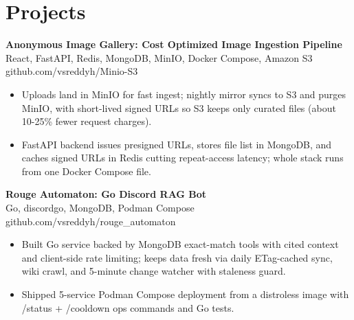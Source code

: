 \documentclass[a4paper,11pt]{article}
\newcommand{\resumeItem}[1]{\item \small{#1}}
\newcommand{\resumeSubheading}[4]{%
  \textbf{#1} \hfill \textbf{#2} \\
{#3} \hfill {#4}
}
\newcommand{\resumeSubHeadingListStart}{\begin{itemize}}
\newcommand{\resumeSubHeadingListEnd}{\end{itemize}}
\begin{document}
\section*{Projects}

\resumeSubheading
{Anonymous Image Gallery: Cost Optimized Image Ingestion Pipeline}{}{React, FastAPI, Redis, MongoDB, MinIO, Docker Compose, Amazon S3}{github.com/vsreddyh/Minio-S3}
\resumeSubHeadingListStart
\resumeItem{Uploads land in MinIO for fast ingest; nightly mirror syncs to S3 and purges MinIO, with short-lived signed URLs so S3 keeps only curated files (about 10-25\% fewer request charges).}
\resumeItem{FastAPI backend issues presigned URLs, stores file list in MongoDB, and caches signed URLs in Redis cutting repeat-access latency; whole stack runs from one Docker Compose file.}
\resumeSubHeadingListEnd

\resumeSubheading
{Rouge Automaton: Go Discord RAG Bot}{}{Go, discordgo, MongoDB, Podman Compose}{github.com/vsreddyh/rouge\_automaton}
\resumeSubHeadingListStart
\resumeItem{Built Go service backed by MongoDB exact-match tools with cited context and client-side rate limiting; keeps data fresh via daily ETag-cached sync, wiki crawl, and 5-minute change watcher with staleness guard.}
\resumeItem{Shipped 5-service Podman Compose deployment from a distroless image with /status + /cooldown ops commands and Go tests.}
\resumeSubHeadingListEnd

\vspace{-0.6em}
\end{document}
